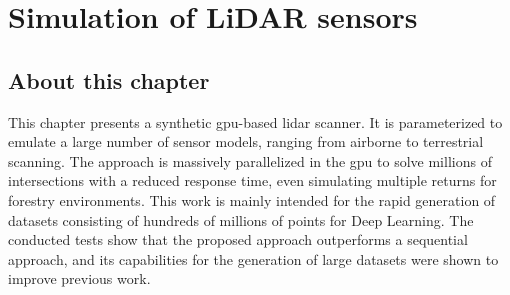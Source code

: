 \setchapterpreamble[u]{\margintoc}
\chapter{Simulation of LiDAR sensors}
\label{sec:lidar_simulation}

\section*{About this chapter}

This chapter presents a synthetic \acrshort{gpu}-based \acrshort{lidar} scanner. It is parameterized to emulate a large number of sensor models, ranging from airborne to terrestrial scanning. The approach is massively parallelized in the \acrshort{gpu} to solve millions of intersections with a reduced response time, even simulating multiple returns for forestry environments. This work is mainly intended for the rapid generation of datasets consisting of hundreds of millions of points for Deep Learning. The conducted tests show that the proposed approach outperforms a sequential approach, and its capabilities for the generation of large datasets were shown to improve previous work. 


